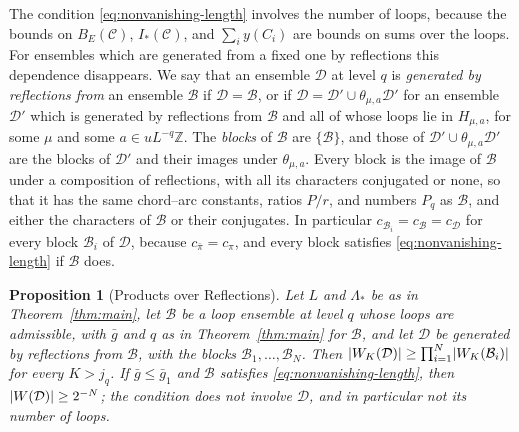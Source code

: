 \documentclass[11pt]{preprint}
\DeclarePairedDelimiter{\abs}{\lvert}{\rvert}
\numberwithin{equation}{section}
\newtheorem{proposition}[theorem]{Proposition}
\theoremstyle{definition}
\theoremstyle{remark}
\theoremstyle{plain}
\begin{document}
The condition \eqref{eq:nonvanishing-length} involves the number of loops, because the bounds on $B_E(\mathcal C)$, $I_*(\mathcal C)$, and $\sum_iy(C_i)$ are bounds on sums over the loops. For ensembles which are generated from a fixed one by reflections this dependence disappears. We say that an ensemble $\mathcal D$ at level $q$ is \emph{generated by reflections from} an ensemble $\mathcal B$ if $\mathcal D = \mathcal B$, or if $\mathcal D = \mathcal D' \cup \theta_{\mu,a}\mathcal D'$ for an ensemble $\mathcal D'$ which is generated by reflections from $\mathcal B$ and all of whose loops lie in $H_{\mu,a}$, for some $\mu$ and some $a \in uL^{-q}\mathbb Z$. The \emph{blocks} of $\mathcal B$ are $\{ \mathcal B \}$, and those of $\mathcal D' \cup \theta_{\mu,a}\mathcal D'$ are the blocks of $\mathcal D'$ and their images under $\theta_{\mu,a}$. Every block is the image of $\mathcal B$ under a composition of reflections, with all its characters conjugated or none, so that it has the same chord--arc constants, ratios $P/r$, and numbers $P_q$ as $\mathcal B$, and either the characters of $\mathcal B$ or their conjugates. In particular $c_{\mathcal B_i} = c_{\mathcal B} = c_{\mathcal D}$ for every block $\mathcal B_i$ of $\mathcal D$, because $c_{\bar\pi} = c_\pi$, and every block satisfies \eqref{eq:nonvanishing-length} if $\mathcal B$ does.

\begin{proposition}[Products over Reflections]\label{prop:reflection-products}
Let $L$ and $\Lambda_*$ be as in Theorem~\ref{thm:main}, let $\mathcal B$ be a loop ensemble at level $q$ whose loops are admissible, with $\bar g$ and $q$ as in Theorem~\ref{thm:main} for $\mathcal B$, and let $\mathcal D$ be generated by reflections from $\mathcal B$, with the blocks $\mathcal B_1, \dots, \mathcal B_N$. Then $\abs{W_K(\mathcal D)} \geq \prod_{i=1}^{N}\abs{W_K(\mathcal B_i)}$ for every $K > j_q$. If $\bar g \leq \bar g_1$ and $\mathcal B$ satisfies \eqref{eq:nonvanishing-length}, then $\abs{W(\mathcal D)} \geq 2^{-N}$; the condition does not involve $\mathcal D$, and in particular not its number of loops.
\end{proposition}
\end{document}
